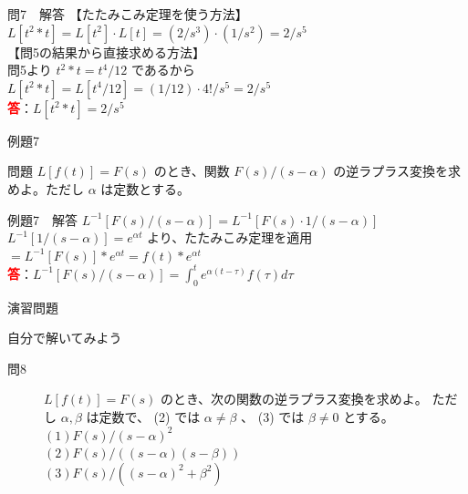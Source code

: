 \documentclass[professionalfonts]{beamer}
\begin{document}
\begin{frame}{問7　解答}
  【たたみこみ定理を使う方法】\\[4pt]
  $L[t^{2}*t] = L[t^{2}]\cdot L[t] = (2/s^{3})\cdot(1/s^{2}) = 2/s^{5}$\\[8pt]
  【問5の結果から直接求める方法】\\[4pt]
  問5より $t^{2}*t = t^{4}/12$ であるから\\[4pt]
  $L[t^{2}*t] = L[t^{4}/12] = (1/12)\cdot4!/s^{5} = 2/s^{5}$
  \\[8pt]\textcolor{red}{\textbf{答}}：$L[t^{2}*t] = 2/s^{5}$
\end{frame}

\begin{frame}{例題7}
  \begin{exampleblock}{問題}
    $L[f(t)] = F(s)$ のとき、関数 $F(s)/(s-\alpha)$ の逆ラプラス変換を求めよ。ただし $\alpha$ は定数とする。\\[2pt]
  \end{exampleblock}
\end{frame}

\begin{frame}{例題7　解答}
  $L^{-1}[F(s)/(s-\alpha)] = L^{-1}[F(s) \cdot 1/(s-\alpha)]$\\[4pt]
  $L^{-1}[1/(s-\alpha)] = e^{\alpha t}$ より、たたみこみ定理を適用\\[4pt]
  $= L^{-1}[F(s)] * e^{\alpha t} = f(t) * e^{\alpha t}$
  \\[8pt]\textcolor{red}{\textbf{答}}：$L^{-1}[F(s)/(s-\alpha)] = \int_{0}^t e^{\alpha(t-\tau)} f(\tau) d\tau$
\end{frame}

\begin{frame}{演習問題}
  \begin{exampleblock}{自分で解いてみよう}
  \begin{description}
    \item[問8] $L[f(t)] = F(s)$ のとき、次の関数の逆ラプラス変換を求めよ。
    ただし $\alpha, \beta$ は定数で、 (2) では $\alpha \neq \beta$ 、 (3) では $\beta \neq 0$ とする。\\
    $(1) F(s)/(s-\alpha)^{2}$\\
    $(2) F(s)/((s-\alpha)(s-\beta))$\\
    $(3) F(s)/((s-\alpha)^{2}+\beta^{2})$\\
  \end{description}
  \end{exampleblock}
\end{frame}
\end{document}
